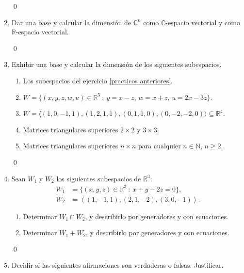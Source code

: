 \begin{enumerate}[resume, topsep=6pt, itemsep=.4cm]
    
    \rta 

    \qed     
    
    \item Dar una base y calcular la dimensión de $\mathbb{C}^n$ como $\mathbb{C}$-espacio vectorial y como $\mathbb{R}$-espacio vectorial.
    
    
    \rta 

    \qed     
    
    \item  Exhibir una base y calcular la dimensión de los siguientes subespacios.
    \begin{enumerate}
        \item Los subespacios del ejercicio \ref{practicos anteriores}.
        \item $W = \{(x,y,z,w,u) \in \mathbb{R}^5 \ : \ y = x - z,\, w = x + z,\,  u = 2x - 3z \}$.
        \item $W = \langle (1, 0, -1, 1),  (1, 2, 1, 1), (0, 1, 1, 0), (0, -2, -2, 0) \rangle \subseteq \mathbb R^4$.
        \item Matrices triangulares superiores $2\times 2$ y $3\times 3$.
        \item Matrices triangulares superiores $n\times n$ para cualquier $n\in\mathbb{N}$, $n\geq 2$.
    \end{enumerate}
    
    \rta 

    \qed     
    
    \item Sean $W_1$ y $W_2$ los siguientes subespacios de $\mathbb{R}^3$:
        \begin{align*}
        W_1 &= \{ (x,y,z)\in\mathbb{R}^3\ : \ x+y-2z=0\},  \\
        W_2 &= {\left\langle(1,-1,1),(2,1,-2),(3,0,-1)\right\rangle}.
        \end{align*}
        \begin{enumerate}
            \item  Determinar $W_1 \cap W_2$, y describirlo por generadores y con ecuaciones.
            \item  Determinar $W_1+W_2$, y describirlo por generadores y con ecuaciones.
        \end{enumerate}
    
    
    \rta 

    \qed     
        
    \item\label{verdadero o falso} Decidir si las siguientes afirmaciones son verdaderas o falsas. Justificar.
    

\end{enumerate}

